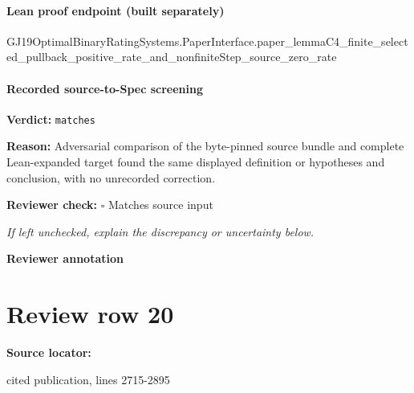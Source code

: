 \documentclass[10pt]{article}
\newcommand{\reviewerbox}{%
  \par\noindent\fbox{\parbox{0.96\linewidth}{\rule{0pt}{0.38in}}}\par
}
\newcommand{\reviewmatch}[1]{%
  \par\noindent\textbf{Reviewer check:} $\square$\; #1\par
  \noindent\emph{If left unchecked, explain the discrepancy or uncertainty below.}\par
}
\begin{document}
\paragraph{Lean proof endpoint (built separately)}\begin{ReviewVerbatim}
GJ19OptimalBinaryRatingSystems.PaperInterface.paper_lemmaC4_finite_selected_pullback_positive_rate_and_nonfiniteStep_source_zero_rate
\end{ReviewVerbatim}

\paragraph{Recorded source-to-Spec screening}
\textbf{Verdict:} \texttt{matches}
\\
{\raggedright
\textbf{Reason:} Adversarial comparison of the byte-\allowbreak{}pinned source bundle and complete Lean-\allowbreak{}expanded target found the same displayed definition or hypotheses and conclusion, with no unrecorded correction.\allowbreak{}
\par}
\reviewmatch{Matches source input}
\noindent\textbf{Reviewer annotation}\par
\reviewerbox
\clearpage
\hypertarget{source-claim-f8aedb48228e5085}{}
\section*{Review row 20}
\textbf{Source locator:} {\footnotesize\raggedright cited publication, lines 2715-\allowbreak{}2895\par}
\end{document}
